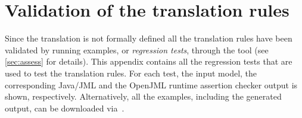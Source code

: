 
\chapter{Validation of the translation rules}
\label{app:regression-tests}

Since the translation is not formally defined all the translation
rules have been validated by running examples, or \emph{regression
  tests}, through the tool (see \cref{sec:assess} for details). This
appendix contains all the regression tests that are used to test the
translation rules. For each test, the input model, the corresponding
Java/JML and the OpenJML runtime assertion checker output is shown,
respectively. Alternatively, all the examples, including the generated
output, can be downloaded via~\cite{AllTestExamples}.



